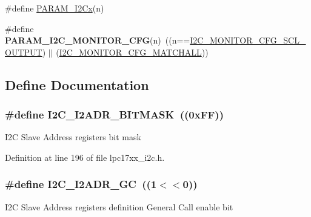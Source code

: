 \begin{DoxyCompactItemize}
\item 
\#define \hyperlink{group___i2_c___private___macros_ga27fcdfae701f8ce7ec72e5b1f8cd0511}{\-P\-A\-R\-A\-M\-\_\-\-I2\-Cx}(n)
\item 
\hypertarget{group___i2_c___private___macros_gae73e3b7919f9a726a0d8f275077e23d2}{\#define {\bfseries \-P\-A\-R\-A\-M\-\_\-\-I2\-C\-\_\-\-M\-O\-N\-I\-T\-O\-R\-\_\-\-C\-F\-G}(n)~((n==\hyperlink{group___i2_c___private___macros_ga5f79529ae357b8aa86e6ead24d95167e}{\-I2\-C\-\_\-\-M\-O\-N\-I\-T\-O\-R\-\_\-\-C\-F\-G\-\_\-\-S\-C\-L\-\_\-\-O\-U\-T\-P\-U\-T}) $|$$|$ (\hyperlink{group___i2_c___private___macros_gadd2b30f5b29839a83c893d88b8d09dd7}{\-I2\-C\-\_\-\-M\-O\-N\-I\-T\-O\-R\-\_\-\-C\-F\-G\-\_\-\-M\-A\-T\-C\-H\-A\-L\-L}))}\label{group___i2_c___private___macros_gae73e3b7919f9a726a0d8f275077e23d2}

\end{DoxyCompactItemize}


\subsection{\-Define \-Documentation}
\hypertarget{group___i2_c___private___macros_ga8d5195514172b58efd29f09642566d37}{
\subsubsection[{\-I2\-C\-\_\-\-I2\-A\-D\-R\-\_\-\-B\-I\-T\-M\-A\-S\-K}]{\setlength{\rightskip}{0pt plus 5cm}\#define {\bf \-I2\-C\-\_\-\-I2\-A\-D\-R\-\_\-\-B\-I\-T\-M\-A\-S\-K}~((0x\-F\-F))}}\label{group___i2_c___private___macros_ga8d5195514172b58efd29f09642566d37}
\-I2\-C \-Slave \-Address registers bit mask 

\-Definition at line 196 of file lpc17xx\-\_\-i2c.\-h.

\hypertarget{group___i2_c___private___macros_ga2509515124601141b72080b5daf45009}{
\subsubsection[{\-I2\-C\-\_\-\-I2\-A\-D\-R\-\_\-\-G\-C}]{\setlength{\rightskip}{0pt plus 5cm}\#define {\bf \-I2\-C\-\_\-\-I2\-A\-D\-R\-\_\-\-G\-C}~((1$<$$<$0))}}\label{group___i2_c___private___macros_ga2509515124601141b72080b5daf45009}
\-I2\-C \-Slave \-Address registers definition \-General \-Call enable bit 

